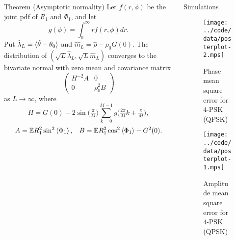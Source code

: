 \documentclass[final,hyperref={pdfpagelabels=false}]{beamer}
\begin{document}
\begin{columns}[t]
\begin{column}{.49\textwidth}
\begin{block}{Theorem (Asymptotic normality)}
Let $f(r,\phi)$ be the joint pdf of $R_1$ and $\Phi_1$, and let
\[
g(\phi) = \int_{0}^{\infty} r f(r,\phi) dr.
\]
Put $\hat{\lambda}_L = \langle \hat{\theta} - \theta_0 \rangle$ and $\hat{m}_L = \hat{\rho} - \rho_0 G(0)$. %
The distribution of $(\sqrt{L}\hat{\lambda}_L, \sqrt{L}\hat{m}_L)$ converges to the bivariate normal with zero mean and covariance matrix
\[
\left( \begin{array}{cc} 
H^{-2} A & 0 \\
0 & \rho_0^2 B
\end{array} \right)
\]
as $L \rightarrow \infty$, where
\vspace{-0.15cm}
\[
H = G(0) -  2 \sin\big(\tfrac{\pi}{M}\big) \sum_{k = 0}^{M-1} g\big(\tfrac{2\pi}{M}k + \tfrac{\pi}{M}\big),
\]
\vspace{-0.15cm}
\[
A = {\mathbb E} R_1^2\sin^2\left\langle \Phi_1 \right\rangle, \;\;\; B = {\mathbb E} R_1^2 \cos^2\left\langle \Phi_1 \right\rangle - G^2(0). 
\]

\end{block}

\end{column}
\begin{column}{.49\textwidth} %

\begin{block}{Simulations}

\begin{figure}
	\centering
		\texttt{[image: ../code/data/posterplot-2.mps]}
		\caption{Phase mean square error for $4$-PSK (QPSK)}
		\label{fig:plotphaseM4}
\end{figure}

\vspace{0.79cm}
\begin{figure}
	\centering
		\texttt{[image: ../code/data/posterplot-1.mps]}
		\caption{Amplitude mean square error for $4$-PSK (QPSK)}
		\label{fig:plotampM4}
\end{figure}

\end{block}


\end{column}
\end{columns}

\end{document}
